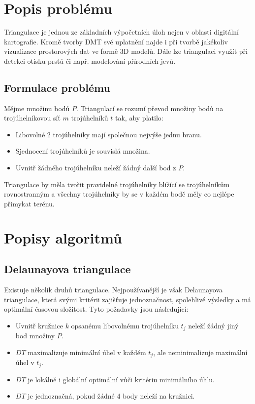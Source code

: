 \documentclass[11pt]{article}
\begin{document}
\section{Popis problému}
Triangulace je jednou ze základních výpočetních úloh nejen v oblasti digitální kartografie. Kromě tvorby DMT své uplatnění najde i při tvorbě jakékoliv vizualizace prostorových dat ve formě 3D modelů. Dále lze triangulaci využít při detekci otisku prstů či např. modelování přírodních jevů.
 
\subsection{Formulace problému}

Mějme množinu bodů $P$. Triangulací se rozumí převod množiny bodů na trojúhelníkovou síť $m$ trojúhelníků $t$ tak, aby platilo:

\begin{itemize}
	\item Libovolné 2 trojúhelníky mají společnou nejvýše jednu hranu.
	\item Sjednocení trojúhelníků je souvislá množina.
	\item Uvnitř žádného trojúhelníku neleží žádný další bod z $P$.	
\end{itemize}

Triangulace by měla tvořit pravidelné trojúhelníky blížící se trojúhelníkům rovnostranným a všechny trojúhelníky by se v každém bodě měly co nejlépe přimykat terénu. 


\section{Popisy algoritmů}
\subsection{Delaunayova triangulace}

Existuje několik druhů triangulace. Nejpoužívanější je však Delaunayova triangulace, která svými kritérii zajišťuje jednoznačnost, spolehlivé výsledky a má optimální časovou složitost. Tyto požadavky jsou následující:

\begin{itemize}
\item Uvnitř kružnice $k$ opsanému libovolnému trojúhelníku $t_{j}$ neleží žádný jiný bod množiny $P$.
\item $DT$ maximalizuje minimální úhel v každém $t_{j}$, ale neminimalizuje maximální úhel v $t_{j}$. 
\item $DT$ je lokálně i globální optimální vůči kritériu minimálního úhlu.
\item $DT$ je jednoznačná, pokud žádné 4 body neleží na kružnici.

\end{itemize}
\end{document}
